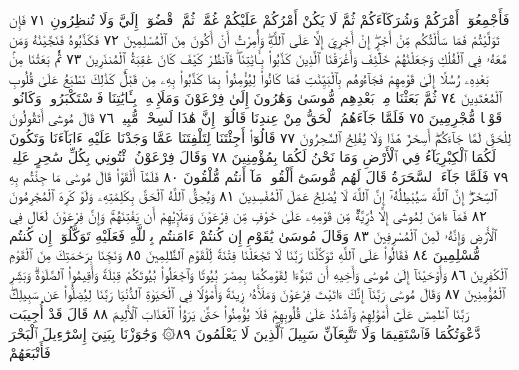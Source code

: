 فَأَجْمِعُوٓا۟ أَمْرَكُمْ وَشُرَكَآءَكُمْ ثُمَّ لَا يَكُنْ أَمْرُكُمْ عَلَيْكُمْ غُمَّةࣰ ثُمَّ
ٱقْضُوٓا۟ إِلَيَّ وَلَا تُنظِرُونِ ٧١ فَإِن تَوَلَّيْتُمْ فَمَا سَأَلْتُكُم مِّنْ أَجْرٍۖ
إِنْ أَجْرِيَ إِلَّا عَلَى ٱللَّهِۖ وَأُمِرْتُ أَنْ أَكُونَ مِنَ ٱلْمُسْلِمِينَ ٧٢
فَكَذَّبُوهُ فَنَجَّيْنَٰهُ وَمَن مَّعَهُۥ فِي ٱلْفُلْكِ وَجَعَلْنَٰهُمْ خَلَٰٓئِفَ
وَأَغْرَقْنَا ٱلَّذِينَ كَذَّبُوا۟ بِـَٔايَٰتِنَاۖ فَٱنظُرْ كَيْفَ كَانَ عَٰقِبَةُ ٱلْمُنذَرِينَ ٧٣
ثُمَّ بَعَثْنَا مِنۢ بَعْدِهِۦ رُسُلًا إِلَىٰ قَوْمِهِمْ فَجَآءُوهُم بِٱلْبَيِّنَٰتِ
فَمَا كَانُوا۟ لِيُؤْمِنُوا۟ بِمَا كَذَّبُوا۟ بِهِۦ مِن قَبْلُۚ كَذَٰلِكَ نَطْبَعُ عَلَىٰ قُلُوبِ
ٱلْمُعْتَدِينَ ٧٤ ثُمَّ بَعَثْنَا مِنۢ بَعْدِهِم مُّوسَىٰ وَهَٰرُونَ إِلَىٰ فِرْعَوْنَ
وَمَلَإِي۟هِۦ بِـَٔايَٰتِنَا فَٱسْتَكْبَرُوا۟ وَكَانُوا۟ قَوْمࣰا مُّجْرِمِينَ ٧٥
فَلَمَّا جَآءَهُمُ ٱلْحَقُّ مِنْ عِندِنَا قَالُوٓا۟ إِنَّ هَٰذَا لَسِحْرࣱ مُّبِينࣱ ٧٦
قَالَ مُوسَىٰٓ أَتَقُولُونَ لِلْحَقِّ لَمَّا جَآءَكُمْۖ أَسِحْرٌ هَٰذَا وَلَا يُفْلِحُ
ٱلسَّٰحِرُونَ ٧٧ قَالُوٓا۟ أَجِئْتَنَا لِتَلْفِتَنَا عَمَّا وَجَدْنَا عَلَيْهِ ءَابَآءَنَا
وَتَكُونَ لَكُمَا ٱلْكِبْرِيَآءُ فِي ٱلْأَرْضِ وَمَا نَحْنُ لَكُمَا بِمُؤْمِنِينَ ٧٨
وَقَالَ فِرْعَوْنُ ٱئْتُونِي بِكُلِّ سَٰحِرٍ عَلِيمࣲ ٧٩ فَلَمَّا جَآءَ ٱلسَّحَرَةُ
قَالَ لَهُم مُّوسَىٰٓ أَلْقُوا۟ مَآ أَنتُم مُّلْقُونَ ٨٠ فَلَمَّآ أَلْقَوْا۟ قَالَ
مُوسَىٰ مَا جِئْتُم بِهِ ٱلسِّحْرُۖ إِنَّ ٱللَّهَ سَيُبْطِلُهُۥٓ إِنَّ ٱللَّهَ لَا يُصْلِحُ
عَمَلَ ٱلْمُفْسِدِينَ ٨١ وَيُحِقُّ ٱللَّهُ ٱلْحَقَّ بِكَلِمَٰتِهِۦ وَلَوْ كَرِهَ
ٱلْمُجْرِمُونَ ٨٢ فَمَآ ءَامَنَ لِمُوسَىٰٓ إِلَّا ذُرِّيَّةࣱ مِّن قَوْمِهِۦ عَلَىٰ
خَوْفࣲ مِّن فِرْعَوْنَ وَمَلَإِي۟هِمْ أَن يَفْتِنَهُمْۚ وَإِنَّ فِرْعَوْنَ لَعَالࣲ
فِي ٱلْأَرْضِ وَإِنَّهُۥ لَمِنَ ٱلْمُسْرِفِينَ ٨٣ وَقَالَ مُوسَىٰ يَٰقَوْمِ إِن
كُنتُمْ ءَامَنتُم بِٱللَّهِ فَعَلَيْهِ تَوَكَّلُوٓا۟ إِن كُنتُم مُّسْلِمِينَ ٨٤
فَقَالُوا۟ عَلَى ٱللَّهِ تَوَكَّلْنَا رَبَّنَا لَا تَجْعَلْنَا فِتْنَةࣰ لِّلْقَوْمِ ٱلظَّٰلِمِينَ ٨٥
وَنَجِّنَا بِرَحْمَتِكَ مِنَ ٱلْقَوْمِ ٱلْكَٰفِرِينَ ٨٦ وَأَوْحَيْنَآ إِلَىٰ مُوسَىٰ
وَأَخِيهِ أَن تَبَوَّءَا لِقَوْمِكُمَا بِمِصْرَ بُيُوتࣰا وَٱجْعَلُوا۟ بُيُوتَكُمْ
قِبْلَةࣰ وَأَقِيمُوا۟ ٱلصَّلَوٰةَۗ وَبَشِّرِ ٱلْمُؤْمِنِينَ ٨٧ وَقَالَ مُوسَىٰ
رَبَّنَآ إِنَّكَ ءَاتَيْتَ فِرْعَوْنَ وَمَلَأَهُۥ زِينَةࣰ وَأَمْوَٰلࣰا فِي ٱلْحَيَوٰةِ
ٱلدُّنْيَا رَبَّنَا لِيُضِلُّوا۟ عَن سَبِيلِكَۖ رَبَّنَا ٱطْمِسْ عَلَىٰٓ أَمْوَٰلِهِمْ
وَٱشْدُدْ عَلَىٰ قُلُوبِهِمْ فَلَا يُؤْمِنُوا۟ حَتَّىٰ يَرَوُا۟ ٱلْعَذَابَ ٱلْأَلِيمَ ٨٨
قَالَ قَدْ أُجِيبَت دَّعْوَتُكُمَا فَٱسْتَقِيمَا وَلَا تَتَّبِعَآنِّ سَبِيلَ
ٱلَّذِينَ لَا يَعْلَمُونَ ٨٩۞ وَجَٰوَزْنَا بِبَنِيٓ إِسْرَٰٓءِيلَ ٱلْبَحْرَ فَأَتْبَعَهُمْ
